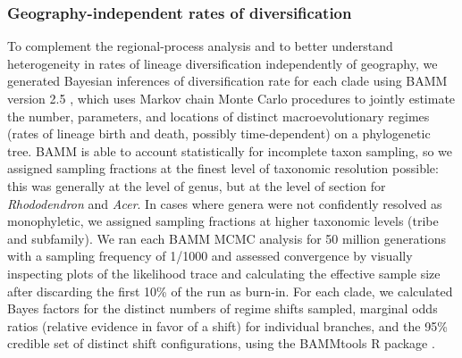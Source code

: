 \subsubsection*{Geography-independent rates of diversification}

To complement the regional-process analysis and to better understand
heterogeneity in rates of lineage diversification independently of
geography, we generated Bayesian inferences of diversification rate
for each clade using BAMM version 2.5 \citep{Rabosky2014}, which uses
Markov chain Monte Carlo procedures to jointly estimate the number,
parameters, and locations of distinct macroevolutionary regimes (rates
of lineage birth and death, possibly time-dependent) on a phylogenetic
tree. BAMM is able to account statistically for incomplete taxon
sampling, so we assigned sampling fractions at the finest level of
taxonomic resolution possible: this was generally at the level of
genus, but at the level of section for \textit{Rhododendron} and
\textit{Acer}. In cases where genera were not confidently resolved as
monophyletic, we assigned sampling fractions at higher taxonomic
levels (tribe and subfamily). We ran each BAMM MCMC analysis for 50
million generations with a sampling frequency of 1/1000 and assessed
convergence by visually inspecting plots of the likelihood trace and
calculating the effective sample size after discarding the first 10\%
of the run as burn-in. For each clade, we calculated Bayes factors for
the distinct numbers of regime shifts sampled, marginal odds ratios
(relative evidence in favor of a shift) for individual branches, and
the 95\% credible set of distinct shift configurations, using the
BAMMtools R package \citep{Rabosky2014}.

